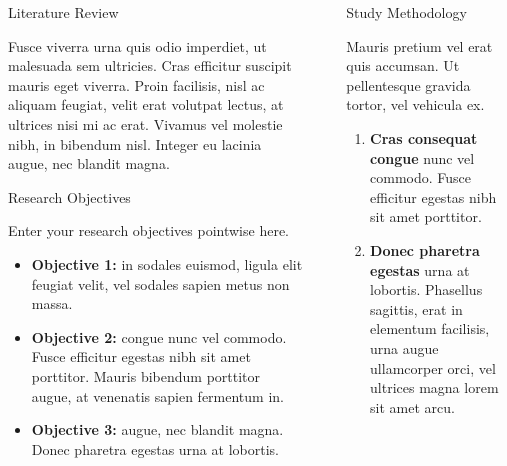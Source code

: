 \documentclass[final]{beamer}
\newlength{\sepwidth}
\newlength{\colwidth}
\newcommand{\separatorcolumn}{\begin{column}{\sepwidth}\end{column}}
\begin{document}
\begin{frame}[t]
\begin{columns}[t]
\begin{column}{\colwidth}
\begin{block}{Literature Review}

    Fusce viverra urna quis odio imperdiet, ut malesuada sem ultricies. Cras efficitur suscipit mauris eget viverra. Proin facilisis, nisl ac aliquam feugiat, velit erat volutpat lectus, at ultrices nisi mi ac erat. Vivamus vel molestie nibh, in bibendum nisl. Integer eu lacinia augue, nec blandit magna.

\end{block}


\begin{alertblock}{Research Objectives}

   Enter your research objectives pointwise here.


    \begin{itemize}
      \item \textbf{Objective 1:} in sodales euismod, ligula elit feugiat velit, vel sodales sapien metus non massa.
      \item \textbf{Objective 2:} congue nunc vel commodo. Fusce efficitur egestas nibh sit amet porttitor. Mauris bibendum porttitor augue, at venenatis sapien fermentum in. 
      \item \textbf{Objective 3:} augue, nec blandit magna. Donec pharetra egestas urna at lobortis. 
    \end{itemize}

\end{alertblock}

\end{column}

\separatorcolumn

\begin{column}{\colwidth}

  \begin{block}{Study Methodology}

    Mauris pretium vel erat quis accumsan. Ut pellentesque gravida tortor, vel vehicula ex.  

    \begin{enumerate}
      \item \textbf{Cras consequat congue} nunc vel commodo. Fusce efficitur egestas nibh sit amet porttitor.
      \item \textbf{Donec pharetra egestas} urna at lobortis. Phasellus sagittis, erat in elementum facilisis, urna augue ullamcorper orci, vel ultrices magna lorem sit amet arcu.
    \end{enumerate}



\end{block}
\end{column}
\end{columns}
\end{frame}
\end{document}
